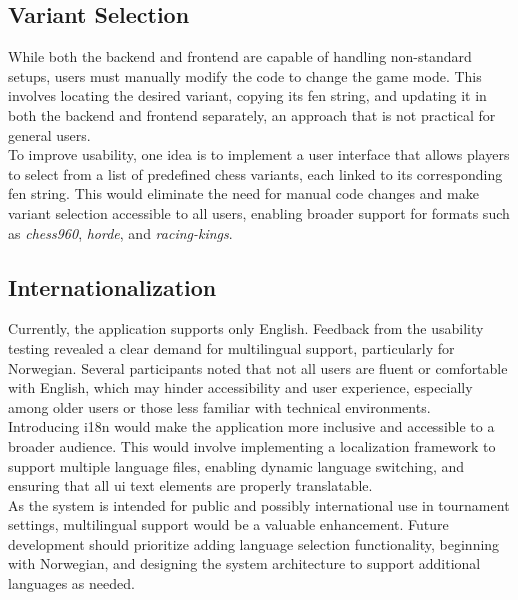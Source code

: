 \subsection{Variant Selection}
While both the backend and frontend are capable of handling non-standard setups, users must manually modify the code to change the game mode. This involves locating the desired variant, copying its \gls{fen} string, and updating it in both the backend and frontend separately, an approach that is not practical for general users. \\

To improve usability, one idea is to implement a user interface that allows players to select from a list of predefined chess variants, each linked to its corresponding \gls{fen} string. This would eliminate the need for manual code changes and make variant selection accessible to all users, enabling broader support for formats such as \textit{\gls{chess960}}, \textit{\gls{horde}}, and \textit{\gls{racing-kings}}.

\subsection{Internationalization}
Currently, the application supports only English. Feedback from the usability testing revealed a clear demand for multilingual support, particularly for Norwegian. Several participants noted that not all users are fluent or comfortable with English, which may hinder accessibility and user experience, especially among older users or those less familiar with technical environments. \\

Introducing \gls{i18n} would make the application more inclusive and accessible to a broader audience. This would involve implementing a localization framework to support multiple language files, enabling dynamic language switching, and ensuring that all \gls{ui} text elements are properly translatable. \\

As the system is intended for public and possibly international use in tournament settings, multilingual support would be a valuable enhancement. Future development should prioritize adding language selection functionality, beginning with Norwegian, and designing the system architecture to support additional languages as needed.
